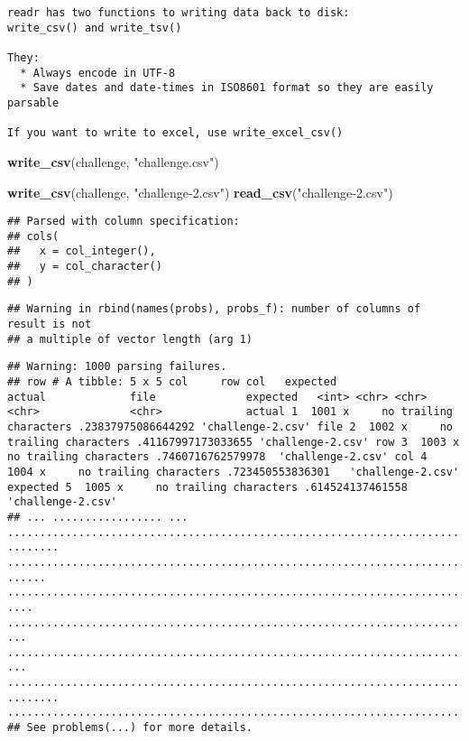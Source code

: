 \documentclass[]{article}
\newenvironment{Shaded}{\begin{snugshade}}{\end{snugshade}}
\newcommand{\KeywordTok}[1]{\textcolor[rgb]{0.13,0.29,0.53}{\textbf{#1}}}
\newcommand{\StringTok}[1]{\textcolor[rgb]{0.31,0.60,0.02}{#1}}
\newcommand{\NormalTok}[1]{#1}
\begin{document}
\begin{verbatim}
readr has two functions to writing data back to disk: 
write_csv() and write_tsv()

They:
  * Always encode in UTF-8
  * Save dates and date-times in ISO8601 format so they are easily parsable
  
If you want to write to excel, use write_excel_csv()
\end{verbatim}

\begin{Shaded}
\begin{Highlighting}[]
\KeywordTok{write_csv}\NormalTok{(challenge, }\StringTok{"challenge.csv"}\NormalTok{)}

\KeywordTok{write_csv}\NormalTok{(challenge, }\StringTok{"challenge-2.csv"}\NormalTok{)}
\KeywordTok{read_csv}\NormalTok{(}\StringTok{"challenge-2.csv"}\NormalTok{)}
\end{Highlighting}
\end{Shaded}

\begin{verbatim}
## Parsed with column specification:
## cols(
##   x = col_integer(),
##   y = col_character()
## )
\end{verbatim}

\begin{verbatim}
## Warning in rbind(names(probs), probs_f): number of columns of result is not
## a multiple of vector length (arg 1)
\end{verbatim}

\begin{verbatim}
## Warning: 1000 parsing failures.
## row # A tibble: 5 x 5 col     row col   expected               actual             file              expected   <int> <chr> <chr>                  <chr>              <chr>             actual 1  1001 x     no trailing characters .23837975086644292 'challenge-2.csv' file 2  1002 x     no trailing characters .41167997173033655 'challenge-2.csv' row 3  1003 x     no trailing characters .7460716762579978  'challenge-2.csv' col 4  1004 x     no trailing characters .723450553836301   'challenge-2.csv' expected 5  1005 x     no trailing characters .614524137461558   'challenge-2.csv'
## ... ................. ... ......................................................................... ........ ......................................................................... ...... ......................................................................... .... ......................................................................... ... ......................................................................... ... ......................................................................... ........ .........................................................................
## See problems(...) for more details.
\end{verbatim}
\end{document}
